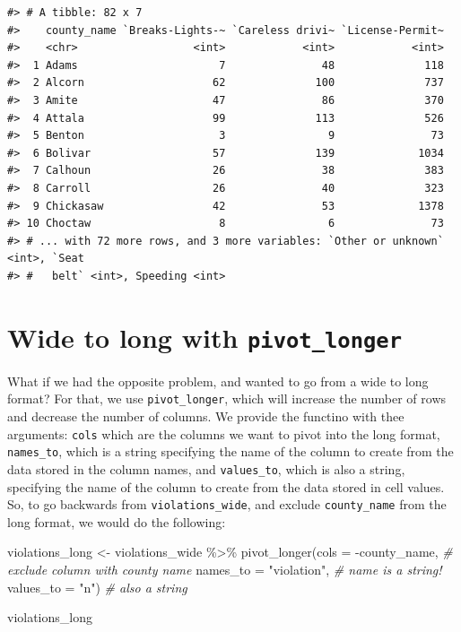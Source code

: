 \documentclass[
]{book}
\newenvironment{Shaded}{\begin{snugshade}}{\end{snugshade}}
\newcommand{\AttributeTok}[1]{\textcolor[rgb]{0.77,0.63,0.00}{#1}}
\newcommand{\CommentTok}[1]{\textcolor[rgb]{0.56,0.35,0.01}{\textit{#1}}}
\newcommand{\FunctionTok}[1]{\textcolor[rgb]{0.00,0.00,0.00}{#1}}
\newcommand{\NormalTok}[1]{#1}
\newcommand{\OtherTok}[1]{\textcolor[rgb]{0.56,0.35,0.01}{#1}}
\newcommand{\SpecialCharTok}[1]{\textcolor[rgb]{0.00,0.00,0.00}{#1}}
\newcommand{\StringTok}[1]{\textcolor[rgb]{0.31,0.60,0.02}{#1}}
\begin{document}
\begin{verbatim}
#> # A tibble: 82 x 7
#>    county_name `Breaks-Lights-~ `Careless drivi~ `License-Permit~
#>    <chr>                  <int>            <int>            <int>
#>  1 Adams                      7               48              118
#>  2 Alcorn                    62              100              737
#>  3 Amite                     47               86              370
#>  4 Attala                    99              113              526
#>  5 Benton                     3                9               73
#>  6 Bolivar                   57              139             1034
#>  7 Calhoun                   26               38              383
#>  8 Carroll                   26               40              323
#>  9 Chickasaw                 42               53             1378
#> 10 Choctaw                    8                6               73
#> # ... with 72 more rows, and 3 more variables: `Other or unknown` <int>, `Seat
#> #   belt` <int>, Speeding <int>
\end{verbatim}

\hypertarget{wide-to-long-with-pivot_longer}{%
\section{\texorpdfstring{Wide to long with \texttt{pivot\_longer}}{Wide to long with pivot\_longer}}\label{wide-to-long-with-pivot_longer}}

What if we had the opposite problem, and wanted to go from a wide to long
format? For that, we use \texttt{pivot\_longer}, which will increase the number of rows and decrease the number of columns. We provide the functino with thee arguments: \texttt{cols} which are the columns we want to pivot into the long format, \texttt{names\_to}, which is a string specifying the name of the column to create from the data stored in the column names, and \texttt{values\_to}, which is also a string, specifying the name of the column to create from the data stored in cell values.
So, to go backwards from \texttt{violations\_wide}, and exclude \texttt{county\_name} from the long format, we would do the following:

\begin{Shaded}
\begin{Highlighting}[]
\NormalTok{violations\_long }\OtherTok{\textless{}{-}}\NormalTok{ violations\_wide }\SpecialCharTok{\%\textgreater{}\%}
  \FunctionTok{pivot\_longer}\NormalTok{(}\AttributeTok{cols =} \SpecialCharTok{{-}}\NormalTok{county\_name,        }\CommentTok{\# exclude column with county name}
               \AttributeTok{names\_to =} \StringTok{"violation"}\NormalTok{,     }\CommentTok{\# name is a string!}
               \AttributeTok{values\_to =} \StringTok{"n"}\NormalTok{)            }\CommentTok{\# also a string}

\NormalTok{violations\_long}
\end{Highlighting}
\end{Shaded}
\end{document}
